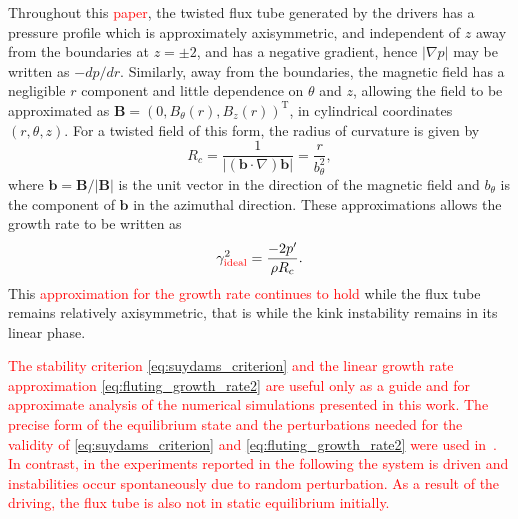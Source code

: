 \documentclass[12pt]{article}
\newcommand{\rs}[2]{\textcolor{red}{#2}}
\renewcommand{\vec}[1]{{\bm #1}}
\begin{document}
Throughout this \rs{chapter}{paper}, the twisted flux tube generated by the drivers has a pressure profile which is approximately axisymmetric, and independent of $z$ away from the boundaries at $z=\pm2$, and has a negative gradient, hence $|\nabla p|$ may be written as $-d p/ dr$. Similarly, away from the boundaries, the magnetic field has a negligible $r$ component and little dependence on $\theta$ and $z$, allowing the field to be approximated as $\vec{B} = (0, B_{\theta}(r), B_z(r))^{\text{T}}$, in cylindrical coordinates $(r, \theta, z)$. For a twisted field of this form, the radius of curvature is given by 
\begin{equation}
  \label{eq:radius_of_curvature}
  R_c = \frac{1}{|(\vec{b}\cdot\nabla) \vec{b}|} = \frac{r}{b_{\theta}^2},
\end{equation}
where $\vec{b} = \vec{B}/|\vec{B}|$ is the unit vector in the direction of the magnetic field and $b_{\theta}$ is the component of $\vec{b}$ in the azimuthal direction. These approximations allows the growth rate to be written as
\begin{equation}
  \label{eq:fluting_growth_rate2}
\gamma_{\rs{{ideal}}{\text{ideal}}}^2 = \frac{-2p'}{\rho R_c}.
\end{equation}
This \rs{growth rate remains applicable}{approximation for the growth rate continues to hold} while the flux tube remains relatively axisymmetric, that is while the kink instability remains in its linear phase.

\rs{In contrast to the precise form of the equilibrium state and
  perturbation studied in~\cite{quinnEffectAnisotropicViscosity2020a},
  this is an experiment where a system is driven and instabilities
  occur organically as a result of noise providing a random
  perturbation. As a result of the driving, the flux tube is not in
  static equilibrium. Consequently, the stability criterion and linear
  growth rate presented previously are useful only as a guide and for
  approximate comparison.}{The stability criterion
  \eqref{eq:suydams_criterion} and the linear
  growth rate approximation \eqref{eq:fluting_growth_rate2} are useful
  only as a guide and for 
  approximate analysis of the numerical simulations presented in this
  work.  The precise form of the equilibrium state and the
  perturbations needed for the validity of
  \eqref{eq:suydams_criterion} and \eqref{eq:fluting_growth_rate2}
  were used in~\cite{quinnEffectAnisotropicViscosity2020a}.
  In contrast, in the experiments reported in the following the system
  is driven and instabilities occur spontaneously due to random
  perturbation. As a result of the driving, the flux tube is also not
  in static equilibrium initially. }
\end{document}
